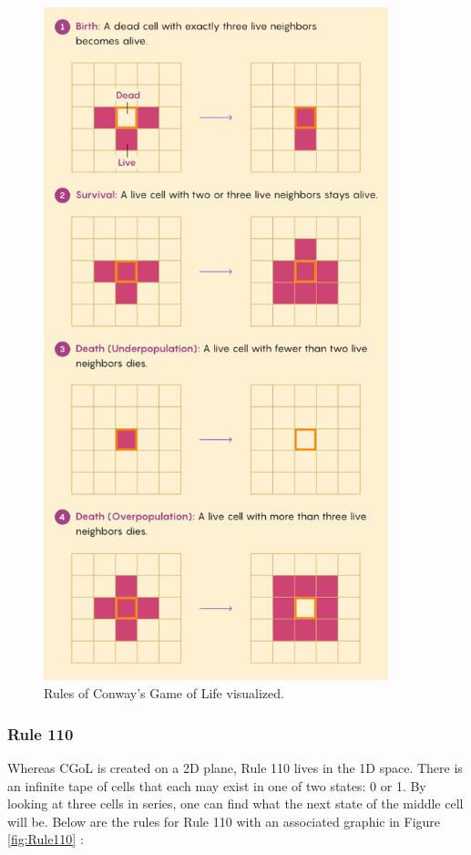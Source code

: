 \begin{figure}[h!]
    \centering
    \includegraphics[width=10cm]{Images/CGoL.png}
       \caption{Rules of Conway's Game of Life visualized.}
            \label{fig:cgolrules}
\end{figure}

\newpage

\subsubsection{Rule 110}\label{subsubsec:Rule110}

Whereas CGoL is created on a 2D plane, Rule 110 lives in the 1D space.
There is an infinite tape of cells that each may exist in one of two states: 0 or 1.
By looking at three cells in series, one can find what the next state of the middle cell will be.
Below are the rules for Rule 110 with an associated graphic in Figure \ref{fig:Rule110} \cite{Rule110Img}:

